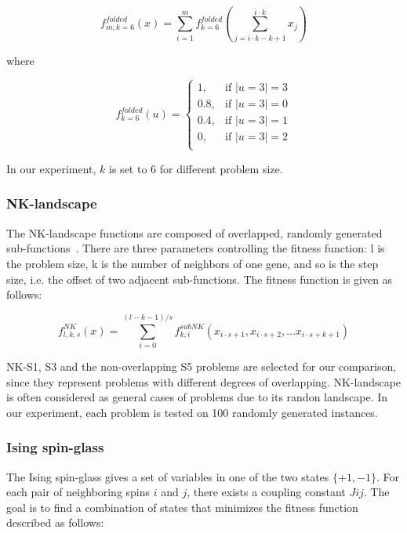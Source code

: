 \documentclass{sig-alternate-05-2015}
\begin{document}
\begin{displaymath}
f_{m,k=6}^{folded}(x) = \sum_{i=1}^{m} f_{k=6}^{folded} \left (\sum_{j = i\cdot k-k+1}^{i\cdot k} x_j\right )
\end{displaymath}

where

\begin{displaymath}
f_{k=6}^{folded}(u) = 
   \begin{cases}
    1, 		& \text{if $|u=3| = 3$} \\
    0.8, 	& \text{if $|u=3| = 0$} \\
    0.4, 	& \text{if $|u=3| = 1$} \\
    0, 		& \text{if $|u=3| = 2$} \\
	\end{cases}
\end{displaymath}

In our experiment, $k$ is set to 6 for different problem size.


\subsubsection{NK-landscape}
The NK-landscape functions are composed of overlapped, randomly generated sub-functions~\cite{pelikan:overlap}. There are three parameters controlling the fitness function: l is the problem size, k is the number of neighbors of one gene, and so is the step size, i.e. the offset of two adjacent sub-functions. The fitness function is given as follows:

\begin{displaymath}
f_{l,k,s}^{NK}(x) = \sum_{i=0}^{(l-k-1)/s} f_{k,i}^{subNK} (x_{i{\cdot}s+1},x_{i{\cdot}s+2},...x_{i{\cdot}s+k+1})
\end{displaymath}


NK-S1, S3 and the non-overlapping S5 problems are selected for our comparison, since they represent problems with different degrees of overlapping. 
NK-landscape is often considered as general cases of problems due to its randon landscape.
In our experiment, each problem is tested on 100 randomly generated instances.



\subsubsection{Ising spin-glass}
The Ising spin-glass gives a set of variables in one of the two states $\{+1, -1\}$. For each pair of neighboring spins $i$ and $j$, there exists a coupling constant $Jij$. The goal is to find a combination of states that minimizes the fitness function described as follows:
\end{document}
